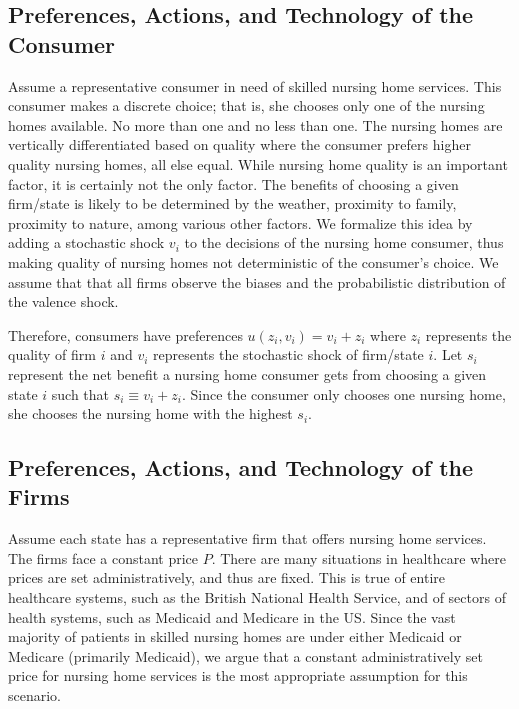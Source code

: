 \documentclass[../Main.tex]{subfiles}
\begin{document}
\subsection{Preferences, Actions, and Technology of the Consumer}
Assume a representative consumer in need of skilled nursing home services. This consumer makes a discrete choice; that is, she chooses only one of the nursing homes available. No more than one and no less than one. The nursing homes are vertically differentiated based on quality where the consumer prefers higher quality nursing homes, all else equal. While nursing home quality is an important factor, it is certainly not the only factor. The benefits of choosing a given firm/state is likely to be determined by the weather, proximity to family, proximity to nature, among various other factors. We formalize this idea by adding a stochastic shock $v_i$ to the decisions of the nursing home consumer, thus making quality of nursing homes not deterministic of the consumer's choice. We assume that that all firms observe the biases and the probabilistic distribution of the valence shock. 

Therefore, consumers have preferences $u(z_i,v_i) = v_i + z_i$ where $z_i$ represents the quality of firm $i$ and $v_i$ represents the stochastic shock of firm/state $i$. Let $s_i$ represent the net benefit a nursing home consumer gets from choosing a given state $i$ such that $s_i \equiv v_i + z_i$. Since the consumer only chooses one nursing home, she chooses the nursing home with the highest $s_i$.

\subsection{Preferences, Actions, and Technology of the Firms}
Assume each state has a representative firm that offers nursing home services. The firms face a constant price $P$. There are many situations in healthcare where prices are set administratively, and thus are fixed. This is true of entire healthcare systems, such as the British National Health Service, and of sectors of health systems, such as Medicaid and Medicare in the US. Since the vast majority of patients in skilled nursing homes are under either Medicaid or Medicare (primarily Medicaid), we argue that a constant administratively set price for nursing home services is the most appropriate assumption for this scenario.
\end{document}
